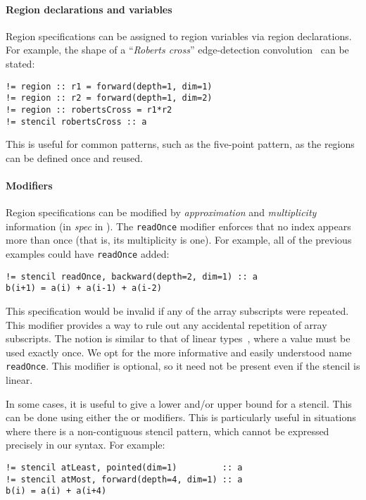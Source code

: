 \documentclass[acmlarge,review,anonymous]{acmart}\settopmatter{printfolios=true}
\theoremstyle{definition}
\theoremstyle{plain}
\begin{document}
\paragraph{Region declarations and variables}

Region specifications can be assigned to region variables via
region declarations. For example, the shape of a
``\emph{Roberts cross}'' edge-detection convolution~\cite{davis1975survey}
can be stated:
\begin{verbatim}
!= region :: r1 = forward(depth=1, dim=1)
!= region :: r2 = forward(depth=1, dim=2)
!= region :: robertsCross = r1*r2
!= stencil robertsCross :: a
\end{verbatim}
This is useful for common patterns, such as the five-point
pattern, as the regions can be defined once and reused.
\paragraph{Modifiers}
Region specifications can be modified
by \emph{approximation} and \emph{multiplicity} information
(in \textit{spec} in ).
The \texttt{readOnce} modifier enforces that no index appears more
than once (that is, its multiplicity is one). For example, all of
the previous examples could have \texttt{readOnce} added:
%
\begin{verbatim}
!= stencil readOnce, backward(depth=2, dim=1) :: a
b(i+1) = a(i) + a(i-1) + a(i-2)
\end{verbatim}
%
This specification would be invalid if any of the
array subscripts were repeated. This modifier provides a way to
rule out any accidental repetition of array subscripts.
The notion is similar to that of linear types~\cite{wadler1990linear}, where a value must be used
exactly once. We opt for the more informative and easily understood name
\texttt{readOnce}. This modifier is optional, so it need not
be present even if the stencil is linear.

In some cases, it is useful to give a lower and/or upper bound for a
stencil. This can be done using either the  or
 modifiers. This is particularly useful in situations
where there is a non-contiguous stencil pattern, which cannot be expressed
precisely in our syntax. For example:
%
\begin{verbatim}
!= stencil atLeast, pointed(dim=1)         :: a
!= stencil atMost, forward(depth=4, dim=1) :: a
b(i) = a(i) + a(i+4)
\end{verbatim}
\end{document}
